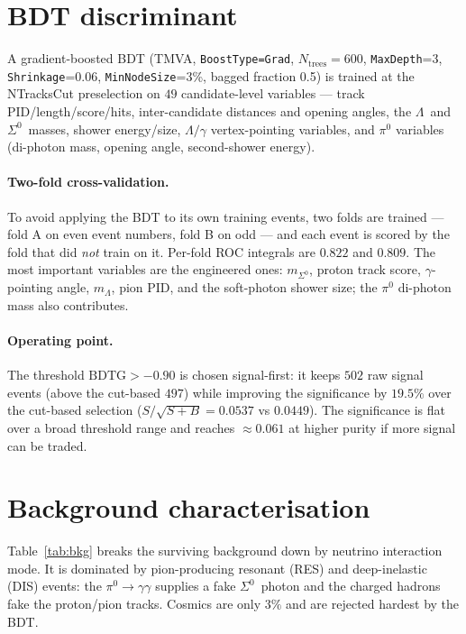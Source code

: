 \documentclass[11pt,a4paper]{article}
\newcommand{\Szero}{\ensuremath{\Sigma^0}}
\newcommand{\Lam}{\ensuremath{\Lambda}}
\newcommand{\FoM}{\ensuremath{S/\sqrt{S+B}}}
\begin{document}
\section{BDT discriminant}
A gradient-boosted BDT (TMVA, \texttt{BoostType=Grad}, $N_\mathrm{trees}=600$,
\texttt{MaxDepth}=3, \texttt{Shrinkage}=0.06, \texttt{MinNodeSize}=3\%,
bagged fraction 0.5) is trained at the NTracksCut preselection on
$49$ candidate-level variables --- track PID/length/score/hits, inter-candidate
distances and opening angles, the \Lam\ and \Szero\ masses, shower energy/size,
$\Lam/\gamma$ vertex-pointing variables, and $\pi^0$ variables (di-photon mass,
opening angle, second-shower energy).

\paragraph{Two-fold cross-validation.}
To avoid applying the BDT to its own training events, two folds are trained ---
fold A on even event numbers, fold B on odd --- and each event is scored by the
fold that did \emph{not} train on it. Per-fold ROC integrals are $0.822$ and
$0.809$. The most important variables are the engineered ones: $m_\Szero$,
proton track score, $\gamma$-pointing angle, $m_\Lam$, pion PID, and the
soft-photon shower size; the $\pi^0$ di-photon mass also contributes.

\paragraph{Operating point.}
The threshold $\mathrm{BDTG}>-0.90$ is chosen signal-first: it keeps $502$ raw
signal events (above the cut-based $497$) while improving the significance by
$19.5\%$ over the cut-based selection ($\FoM = 0.0537$ vs $0.0449$). The
significance is flat over a broad threshold range and reaches $\approx 0.061$ at
higher purity if more signal can be traded.

\section{Background characterisation}
Table~\ref{tab:bkg} breaks the surviving background down by neutrino interaction
mode. It is dominated by pion-producing resonant (RES) and deep-inelastic (DIS)
events: the $\pi^0\!\to\!\gamma\gamma$ supplies a fake \Szero\ photon and the
charged hadrons fake the proton/pion tracks. Cosmics are only $3\%$ and are
rejected hardest by the BDT.
\end{document}
